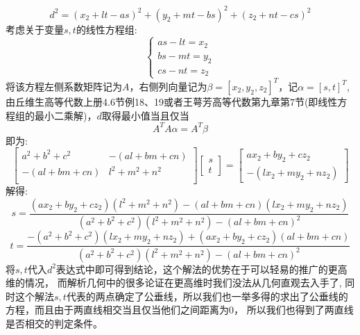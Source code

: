 \documentclass[a4paper,12pt]{ctexart}
\newenvironment{prooff}{{\noindent\it\textcolor{cyan!40!black}{Proof}:}\quad}{\par}
\begin{document}
\begin{prooff}
    \begin{equation*}
        d^2=(x_2+lt-as)^2+(y_2+mt-bs)^2+(z_2+nt-cs)^2
    \end{equation*}
    考虑关于变量$s,t$的线性方程组:
    \begin{equation*}
        \begin{cases}
            as-lt=x_2 \\
            bs-mt=y_2 \\
            cs-nt=z_2
        \end{cases}
    \end{equation*}
    将该方程左侧系数矩阵记为$A$，右侧列向量记为$\beta=[x_2,y_2,z_2]^{T}$，记$\alpha=[s,t]^{T}$,由丘维生高等代数上册4.6节例18、19或者王萼芳高等代数第九章第$7$节(即线性方程组的最小二乘解)，$d$取得最小值当且仅当
    \begin{equation*}
        A^{T}A\alpha =A^{T}\beta
    \end{equation*}
    即为:
    \begin{equation*}
        \begin{bmatrix}
            a^2+b^2+c^2 & -(al+bm+cn)  \\
            -(al+bm+cn) & l^2+m^2+ n^2 \\
        \end{bmatrix}\begin{bmatrix}
            s \\
            t
        \end{bmatrix}=\begin{bmatrix}
            ax_2+by_2+cz_2 \\
            -(lx_2+my_2+nz_2)
        \end{bmatrix}
    \end{equation*}
    解得:
    \begin{equation*}
        s=\frac{(ax_2+by_2+cz_2)(l^2+m^2+n^2)-(al+bm+cn)(lx_2+my_2+nz_2)}{(a^2+b^2+c^2)(l^2+m^2+ n^2)-(al+bm+cn)^2}
    \end{equation*}
    \begin{equation*}
        t=\frac{-( a^2+b^2+c^2)(lx_2+my_2+nz_2)+(ax_2+by_2+cz_2)(al+bm+cn)}{(a^2+b^2+c^2)(l^2+m^2+ n^2)-(al+bm+cn)^2}
    \end{equation*}
    将$s,t$代入$d^2$表达式中即可得到结论，这个解法的优势在于可以轻易的推广的更高维的情况，
    而解析几何中的很多论证在更高维时我们没法从几何直观去入手了,
    同时这个解法$s,t$代表的两点确定了公垂线，所以我们也一举多得的求出了公垂线的方程，而且由于两直线相交当且仅当他们之间距离为0，
    所以我们也得到了两直线是否相交的判定条件。
\end{prooff}
\end{document}
